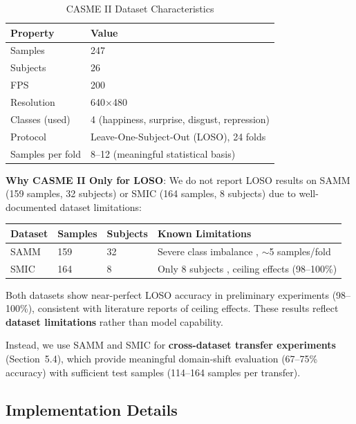 \documentclass[preprint,12pt,authoryear]{elsarticle}
\begin{document}
\begin{table}[htbp]
\centering
\caption{CASME II Dataset Characteristics}
\label{tab:dataset}
\begin{tabular}{ll}
\toprule
\textbf{Property} & \textbf{Value} \\
\midrule
Samples & 247 \\
Subjects & 26 \\
FPS & 200 \\
Resolution & 640$\times$480 \\
Classes (used) & 4 (happiness, surprise, disgust, repression) \\
Protocol & Leave-One-Subject-Out (LOSO), 24 folds \\
Samples per fold & 8--12 (meaningful statistical basis) \\
\bottomrule
\end{tabular}
\end{table}

\textbf{Why CASME II Only for LOSO}: We do not report LOSO results on SAMM (159 samples, 32 subjects) or SMIC (164 samples, 8 subjects) due to well-documented dataset limitations:

\begin{table}[htbp]
\centering
\begin{tabular}{llll}
\toprule
\textbf{Dataset} & \textbf{Samples} & \textbf{Subjects} & \textbf{Known Limitations} \\
\midrule
SAMM & 159 & 32 & Severe class imbalance \cite{davison2018samm}, $\sim$5 samples/fold \\
SMIC & 164 & 8 & Only 8 subjects \cite{li2016smic}, ceiling effects (98--100\%) \\
\bottomrule
\end{tabular}
\end{table}

Both datasets show near-perfect LOSO accuracy in preliminary experiments (98--100\%), consistent with literature reports of ceiling effects. These results reflect \textbf{dataset limitations} rather than model capability.

Instead, we use SAMM and SMIC for \textbf{cross-dataset transfer experiments} (Section~5.4), which provide meaningful domain-shift evaluation (67--75\% accuracy) with sufficient test samples (114--164 samples per transfer).

\subsection{Implementation Details}
\end{document}
